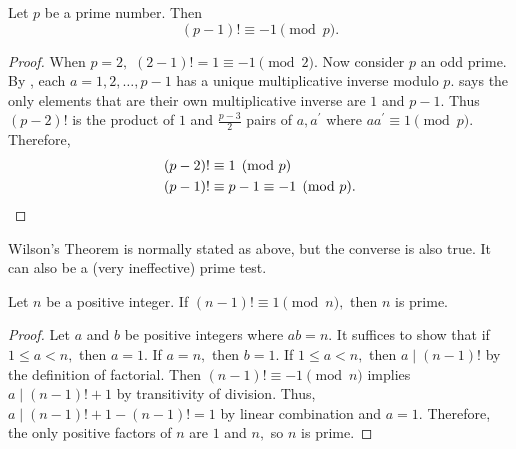 \documentclass[letterpaper, 11 pt]{ximera}
\begin{document}
\begin{thm*}\label{Wilson}
    Let $p$ be a prime number. Then \[(p-1)!\equiv -1\pmod{p}.\]
\end{thm*}

\begin{proof}
    When $p=2,$ $(2-1)!=1\equiv -1 \pmod{2}.$ Now consider $p$ an odd prime. By , each $a=1,2,\dots,p-1$ has a unique multiplicative inverse modulo $p.$  says the only elements that are their own multiplicative inverse are $1$ and $p-1$. Thus $(p-2)!$ is the product of $1$ and $\frac{p-3}{2}$ pairs of $a,a^\prime$ where $a a^\prime\equiv 1\pmod{p}.$ Therefore, 
    \begin{align*}
        (p-2)! & \equiv 1\pmod{p}\\
        (p-1)! & \equiv p-1\equiv -1 \pmod{p}.\qedhere
    \end{align*}
\end{proof}

Wilson's Theorem is normally stated as above, but the converse is also true. It can also be a (very ineffective) prime test.
\begin{prop*}[Proposition 2.12]\label{Wilson-converse}
    Let $n$ be a positive integer. If $(n-1)!\equiv 1\pmod{n},$ then $n$ is prime.
\end{prop*}

\begin{proof}
    Let $a$ and $b$ be positive integers where $ab=n.$ It suffices to show that if $1\leq a < n,$ then $a=1.$ If $a=n,$ then $b=1.$ If  $1\leq a < n,$ then $a\mid (n-1)!$ by the definition of factorial. Then $(n-1)!\equiv -1\pmod{n}$ implies $a\mid (n-1)!+1$ by transitivity of division. Thus, $a\mid (n-1)!+1-(n-1)!=1$ by linear combination and $a=1.$ Therefore, the only positive factors of $n$ are $1$ and $n,$ so $n$ is prime.
\end{proof}
\end{document}
